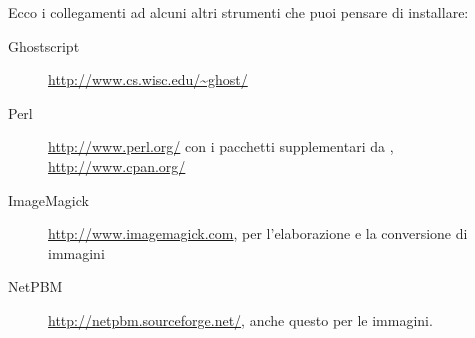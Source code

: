 \documentclass{article}
\begin{document}
Ecco i collegamenti ad alcuni altri strumenti che puoi pensare di
installare:
\begin{description}
\item[Ghostscript] \url{http://www.cs.wisc.edu/~ghost/}
\item[Perl] \url{http://www.perl.org/} con i pacchetti supplementari da
      , \url{http://www.cpan.org/}
\item[ImageMagick] \url{http://www.imagemagick.com}, per l'elaborazione e
      la conversione di immagini
\item[NetPBM] \url{http://netpbm.sourceforge.net/}, anche questo per le
      immagini.


\end{description}
\end{document}

